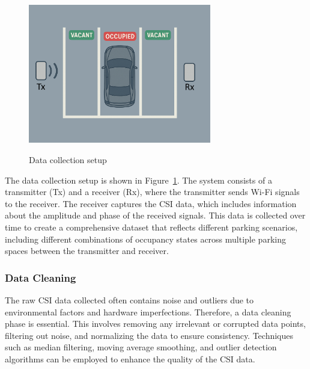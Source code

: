 \begin{figure}[H]
    \begin{center}
        \includegraphics[width=8cm]{Figures/layout.png}\vspace{0mm}
        \caption{Data collection setup}\vspace{0mm}
        \label{fig:data_collection_setup}
    \end{center}
\end{figure}

    The data collection setup is shown in Figure~\ref{fig:data_collection_setup}. The system consists of a transmitter (Tx) and a receiver (Rx), where the transmitter sends Wi-Fi signals to the receiver. The receiver captures the CSI data, which includes information about the amplitude and phase of the received signals. This data is collected over time to create a comprehensive dataset that reflects different parking scenarios, including different combinations of occupancy states across multiple parking spaces between the transmitter and receiver. 

\subsubsection{Data Cleaning}
The raw CSI data collected often contains noise and outliers due to environmental factors and hardware imperfections. Therefore, a data cleaning phase is essential. This involves removing any irrelevant or corrupted data points, filtering out noise, and normalizing the data to ensure consistency. Techniques such as median filtering, moving average smoothing, and outlier detection algorithms can be employed to enhance the quality of the CSI data.

